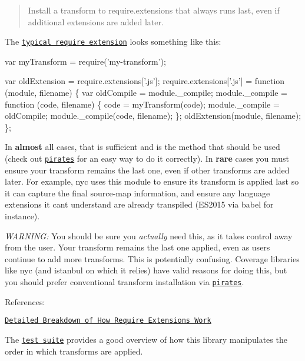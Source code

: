 \begin{quote}
Install a transform to {\ttfamily require.\+extensions} that always runs last, even if additional extensions are added later. \end{quote}


The \href{https://gist.github.com/jamestalmage/df922691475cff66c7e6}{\tt typical require extension} looks something like this\+:


\begin{DoxyCode}
var myTransform = require('my-transform');

var oldExtension = require.extensions['.js'];
require.extensions['.js'] = function (module, filename) \{
  var oldCompile = module.\_compile;
  module.\_compile = function (code, filename) \{
    code = myTransform(code);
    module.\_compile = oldCompile;
    module.\_compile(code, filename);
  \};  
  oldExtension(module, filename);
\};
\end{DoxyCode}


In {\bfseries almost} all cases, that is sufficient and is the method that should be used (check out \href{https://www.npmjs.com/package/pirates}{\tt {\ttfamily pirates}} for an easy way to do it correctly). In {\bfseries rare} cases you must ensure your transform remains the last one, even if other transforms are added later. For example, {\ttfamily nyc} uses this module to ensure its transform is applied last so it can capture the final source-\/map information, and ensure any language extensions it can\textquotesingle{}t understand are already transpiled (E\+S2015 via {\ttfamily babel} for instance).

{\itshape W\+A\+R\+N\+I\+NG\+:} You should be sure you {\itshape actually} need this, as it takes control away from the user. Your transform remains the last one applied, even as users continue to add more transforms. This is potentially confusing. Coverage libraries like {\ttfamily nyc} (and {\ttfamily istanbul} on which it relies) have valid reasons for doing this, but you should prefer conventional transform installation via \href{https://www.npmjs.com/package/pirates}{\tt {\ttfamily pirates}}.

References\+:
\begin{DoxyItemize}
\item \href{https://gist.github.com/jamestalmage/df922691475cff66c7e6}{\tt Detailed Breakdown of How Require Extensions Work}
\item The \href{https://github.com/jamestalmage/append-transform/blob/master/test/execution-order.js}{\tt test suite} provides a good overview of how this library manipulates the order in which transforms are applied.
\end{DoxyItemize}

